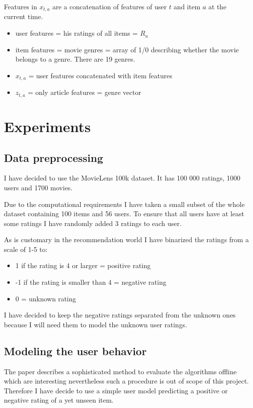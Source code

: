 \documentclass[12pt, titlepage]{article}
\begin{document}
Features in $x_{t,a}$ are a concatenation of features of user $t$ and item $a$ at the current time.

\begin{itemize}
\item user features = his ratings of all items = $R_u$
\item item features = movie genres = array of 1/0 describing whether the movie belongs to a genre. There are 19 genres.
\item $x_{t,a}$ = user features concatenated with item features
\item $z_{t,a}$ = only article features = genre vector
\end{itemize}




\section{Experiments}\label{sec:exp}

\subsection{Data preprocessing}
I have decided to use the MovieLens 100k dataset. 
It has 100 000 ratings, 1000 users and 1700 movies. \cite{cit:ml}

Due to the computational requirements I have taken a small subset of the whole dataset containing 100 items and 56 users. To ensure that all users have at least some ratings I have randomly added 3 ratings to each user.

As is customary in the recommendation world I have binarized the ratings from a scale of 1-5 to:

\begin{itemize}
\item 1 if the rating is 4 or larger = positive rating
\item -1 if the rating is smaller than 4 = negative rating
\item 0 = unknown rating
\end{itemize}

I have decided to keep the negative ratings separated from the unknown ones because I will need them to model the unknown user ratings.

\subsection{Modeling the user behavior}
The paper describes a sophisticated method to evaluate the algorithms offline which are interesting nevertheless such a procedure is out of scope of this project. Therefore I have decide to use a simple user model predicting a positive or negative rating of a yet unseen item.
\end{document}
